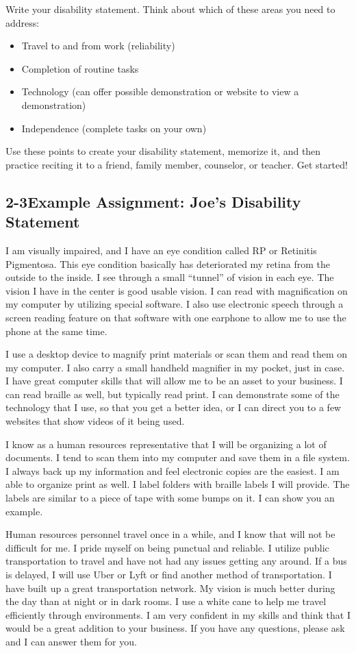 Write your disability statement. Think about which of these areas you need to address:
\begin{itemize}[leftmargin=1.0cm]
	\item Travel to and from work (reliability)
	\item Completion of routine tasks
	\item Technology (can offer possible demonstration or website to view a demonstration)
	\item Independence (complete tasks on your own)
\end{itemize}
Use these points to create your disability statement, memorize it, and then practice reciting it to a friend, family member, counselor, or teacher. Get started!
\pagebreak \subsection*{2-3\quad Example Assignment: Joe's Disability Statement}
I am visually impaired, and I have an eye condition called RP or Retinitis Pigmentosa. This eye condition basically has deteriorated my retina from the outside to the inside. I see through a small ``tunnel'' of vision in each eye. The vision I have in the center is good usable vision. I can read with magnification on my computer by utilizing special software. I also use electronic speech through a screen reading feature on that software with one earphone to allow me to use the phone at the same time.

I use a desktop device to magnify print materials or scan them and read them on my computer. I also carry a small handheld magnifier in my pocket, just in case. I have great computer skills that will allow me to be an asset to your business. I can read braille as well, but typically read print. I can demonstrate some of the technology that I use, so that you get a better idea, or I can direct you to a few websites that show videos of it being used.

I know as a human resources representative that I will be organizing a lot of documents. I tend to scan them into my computer and save them in a file system. I always back up my information and feel electronic copies are the easiest. I am able to organize print as well. I label folders with braille labels I will provide. The labels are similar to a piece of tape with some bumps on it. I can show you an example.

Human resources personnel travel once in a while, and I know that will not be difficult for me. I pride myself on being punctual and reliable. I utilize public transportation to travel and have not had any issues getting any around. If a bus is delayed, I will use Uber or Lyft or find another method of transportation. I have built up a great transportation network. My vision is much better during the day than at night or in dark rooms. I use a white cane to help me travel efficiently through environments. I am very confident in my skills and think that I would be a great addition to your business. If you have any questions, please ask and I can answer them for you.

